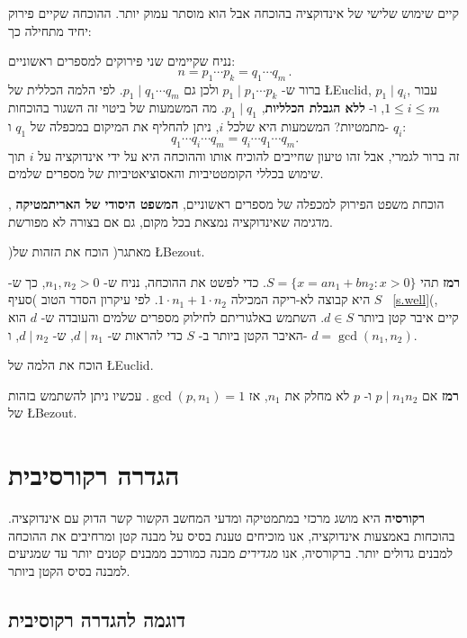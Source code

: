 קיים שימוש שלישי של אינדוקציה בהוכחה אבל הוא מוסתר עמוק יותר. ההוכחה שקיים פירוק יחיד מתחילה כך:

נניח שקיימים שני פירוקים למספרים ראשוניים:
\[
n=p_1 \cdots p_k = q_1 \cdots q_m\,.
\]
ברור ש-%
$p_1\mid p_1 \cdots p_k$
ולכן גם
$p_1 \mid q_1 \cdots q_m$.
לפי הלמה הכללית של
\L{Euclid},
$p_1 \mid q_i$,
עבור
$1\leq i \leq m$,
ו-%
\textbf{ללא הגבלת הכלליות},
$p_1 \mid q_1$.
מה המשמעות של ביטוי זה השגור בהוכחות מתמטיות? המשמעות היא שלכל
$i$,
ניתן להחליף את המיקום במכפלה של
$q_1$
ו-%
$q_i$:
\[
q_1 \cdots q_i \cdots q_m = q_i \cdots q_1 \cdots q_m.
\]
זה ברור לגמרי, אבל זהו טיעון שחייבים להוכיח אותו וההוכחה היא על ידי אינדוקציה על
$i$
תוך שימוש בכללי הקומטטיביות והאסוציאטיביות של מספרים שלמים.

הוכחת משפט הפירוק למכפלה של מספרים ראשוניים,
\textbf{%
המשפט היסודי של האריתמטיקה%
},
מדגימה שאינדוקציה נמצאת בכל מקום, גם אם בצורה לא מפורשת.

\begin{exercise}
)מאתגר( הוכח את הזהות של
\L{Bezout}.
\end{exercise}
\textbf{רמז}
תהי
$S=\{x = an_1+bn_2: x>0\}$.
כדי לפשט את ההוכחה, נניח ש-%
$n_1,n_2>0$,
כך ש-%
$S$
היא קבוצה לא-ריקה המכילה
$1\cdot n_1+1\cdot n_2$.
לפי עיקרון הסדר הטוב )סעיף~%
\ref{s.well}(,
קיים איבר קטן ביותר
$d\in S$.
השתמש באלגוריתם לחילוק מספרים שלמים והעובדה ש-%
$d$
הוא האיבר הקטן ביותר ב-%
$S$
כדי להראות ש-%
$d\mid n_1$,
ש-%
$d\mid n_2$,
ו-%
$d=\gcd(n_1,n_2)$.

\begin{exercise}
הוכח את הלמה של
\L{Euclid}.
\end{exercise}
\textbf{רמז}
אם
$p\mid n_1n_2$
ו-%
$p$
לא מחלק את
$n_1$,
אז
$\gcd(p,n_1)=1$.
עכשיו ניתן להשתמש בזהות של
\L{Bezout}.

\section{%
הגדרה רקורסיבית%
}

\textbf{רקורסיה}
היא מושג מרכזי במתמטיקה ומדעי המחשב הקשור קשר הדוק עם אינדוקציה. בהוכחות באמצעות אינדוקציה, אנו מוכיחים טענת בסיס על מבנה קטן ומרחיבים את ההוכחה למבנים גדולים יותר. ברקורסיה, אנו
\emph{מגדירים}
מבנה כמורכב ממבנים קטנים יותר עד שמגיעים למבנה בסיס הקטן ביותר.

\subsection*{%
דוגמה להגדרה רקוסיבית%
}

